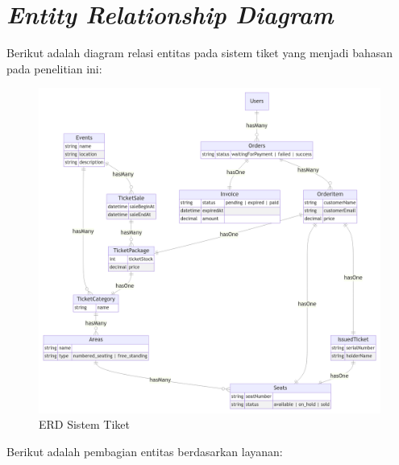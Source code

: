 \section{\textit{Entity Relationship Diagram}}

Berikut adalah diagram relasi entitas pada sistem tiket yang menjadi bahasan pada penelitian ini:

\begin{figure}[htbp]
    \centering
    \includegraphics[width=1\textwidth]{resources/appendix/erd.png}
    \caption{ERD Sistem Tiket}
    \label{fig:ticket-system-erd-proposal}
\end{figure}

Berikut adalah pembagian entitas berdasarkan layanan:

